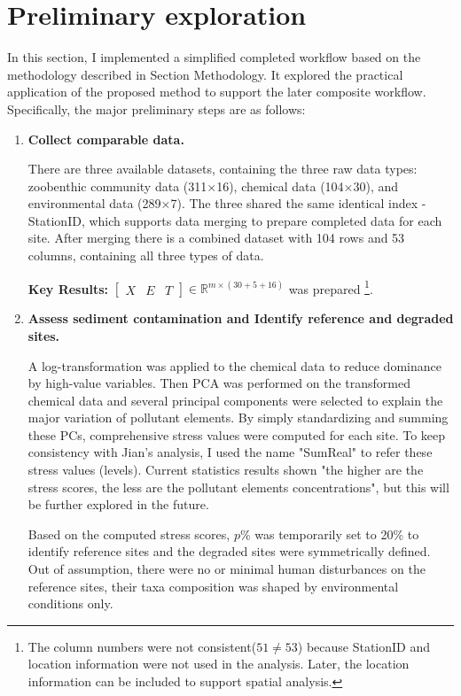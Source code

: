 \section{Preliminary exploration}

In this section, I implemented a simplified completed workflow based 
on the methodology described in Section Methodology. 
It explored the practical application of the proposed method to support the later composite workflow.
Specifically, the major preliminary steps are as follows:

\begin{enumerate}

\item \textbf{Collect comparable data.}

There are three available datasets, containing the three raw data types: zoobenthic community data (311×16), chemical data (104×30), and environmental data (289×7).
The three shared the same identical index - StationID, which supports data merging to prepare completed data for 
each site. After merging there is a combined dataset with 104 rows and 53 columns, containing all three types of data.

\textbf{Key Results:} \(\left[
\begin{array}{ccc}
X & E & T
\end{array}
\right]
\in
\mathbb{R}^{m \times (30 + 5 + 16)}\) was prepared
\footnote{
The column numbers were not consistent(\(51 \neq 53\))
because StationID and location information were not used in the analysis.
Later, the location information can be included to support spatial analysis.
}.

\item \textbf{Assess sediment contamination and Identify reference and degraded sites.}

A log-transformation was applied to the chemical data to reduce dominance by high-value variables.
Then PCA was performed on the transformed chemical data and several principal components were selected to explain
the major variation of pollutant elements. By simply standardizing and summing these PCs, comprehensive stress values were computed for each site.
To keep consistency with Jian's analysis, I used the name "SumReal" to refer these stress values (levels).
Current statistics results shown "the higher are the stress scores, the less are the pollutant elements concentrations",
but this will be further explored in the future.

Based on the computed stress scores,  \(p\%\) was temporarily set to 20\% to identify reference sites and the degraded sites were symmetrically defined.
Out of assumption, there were no or minimal human disturbances on the reference sites, their taxa composition was shaped by environmental conditions only.



\end{enumerate}
